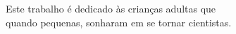 %
%
%
%


Este trabalho é dedicado às crianças adultas que \\
quando pequenas, sonharam em se tornar cientistas.